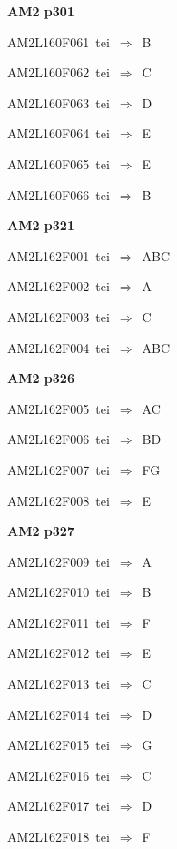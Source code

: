 \par\vfill\eject
{\bf\hfill AM2 p301\hfill\hbox{}}\par\bigskip
{\sixrm AM2L160F061\ {\sixit tei}\ }$\Rightarrow$\ B\par\smallskip
{\sixrm AM2L160F062\ {\sixit tei}\ }$\Rightarrow$\ C\par\smallskip
{\sixrm AM2L160F063\ {\sixit tei}\ }$\Rightarrow$\ D\par\smallskip
{\sixrm AM2L160F064\ {\sixit tei}\ }$\Rightarrow$\ E\par\smallskip
{\sixrm AM2L160F065\ {\sixit tei}\ }$\Rightarrow$\ E\par\smallskip
{\sixrm AM2L160F066\ {\sixit tei}\ }$\Rightarrow$\ B\par\smallskip

\par\vfill\eject
{\bf\hfill AM2 p321\hfill\hbox{}}\par\bigskip
{\sixrm AM2L162F001\ {\sixit tei}\ }$\Rightarrow$\ ABC\par\smallskip
{\sixrm AM2L162F002\ {\sixit tei}\ }$\Rightarrow$\ A\par\smallskip
{\sixrm AM2L162F003\ {\sixit tei}\ }$\Rightarrow$\ C\par\smallskip
{\sixrm AM2L162F004\ {\sixit tei}\ }$\Rightarrow$\ ABC\par\smallskip

\par\vfill\eject
{\bf\hfill AM2 p326\hfill\hbox{}}\par\bigskip
{\sixrm AM2L162F005\ {\sixit tei}\ }$\Rightarrow$\ AC\par\smallskip
{\sixrm AM2L162F006\ {\sixit tei}\ }$\Rightarrow$\ BD\par\smallskip
{\sixrm AM2L162F007\ {\sixit tei}\ }$\Rightarrow$\ FG\par\smallskip
{\sixrm AM2L162F008\ {\sixit tei}\ }$\Rightarrow$\ E\par\smallskip

\par\vfill\eject
{\bf\hfill AM2 p327\hfill\hbox{}}\par\bigskip
{\sixrm AM2L162F009\ {\sixit tei}\ }$\Rightarrow$\ A\par\smallskip
{\sixrm AM2L162F010\ {\sixit tei}\ }$\Rightarrow$\ B\par\smallskip
{\sixrm AM2L162F011\ {\sixit tei}\ }$\Rightarrow$\ F\par\smallskip
{\sixrm AM2L162F012\ {\sixit tei}\ }$\Rightarrow$\ E\par\smallskip
{\sixrm AM2L162F013\ {\sixit tei}\ }$\Rightarrow$\ C\par\smallskip
{\sixrm AM2L162F014\ {\sixit tei}\ }$\Rightarrow$\ D\par\smallskip
{\sixrm AM2L162F015\ {\sixit tei}\ }$\Rightarrow$\ G\par\smallskip
{\sixrm AM2L162F016\ {\sixit tei}\ }$\Rightarrow$\ C\par\smallskip
{\sixrm AM2L162F017\ {\sixit tei}\ }$\Rightarrow$\ D\par\smallskip
{\sixrm AM2L162F018\ {\sixit tei}\ }$\Rightarrow$\ F\par\smallskip

